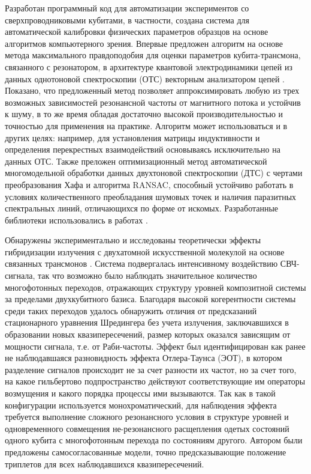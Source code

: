 \documentclass[14pt, a4paper]{extarticle}
\begin{document}
Разработан программный код для автоматизации экспериментов со сверхпроводниковыми кубитами, в частности, создана система для автоматической калибровки физических параметров образцов на основе алгоритмов компьютерного зрения. Впервые предложен алгоритм на основе метода максимального правдоподобия для оценки параметров кубита-трансмона, связанного с резонатором, в архитектуре квантовой электродинамики цепей из данных однотоновой спектроскопии (ОТС) векторным анализатором цепей . Показано, что предложенный метод позволяет аппроксимировать любую из трех возможных зависимостей резонансной частоты от магнитного потока и устойчив к шуму, в то же время обладая достаточно высокой производительностью и точностью для применения на практике. Алгоритм может использоваться и в других целях: например, для установления матрицы индуктивности и определения перекрестных взаимодействий основываясь исключительно на данных ОТС. Также преложен оптимизационный метод автоматической многомодельной обработки данных двухтоновой спектроскопии (ДТС) с чертами преобразования Хафа и алгоритма RANSAC, способный устойчиво работать в условиях количественного преобладания шумовых точек и наличия паразитных спектральных линий, отличающихся по форме от искомых. Разработанные библиотеки использовались в работах .

Обнаружены экспериментально и исследованы теоретически эффекты гибридизации излучения с двухатомной искусственной молекулой на основе связанных трансмонов \cite{fedorov2020light}. Система подвергалась интенсивному воздействию СВЧ-сигнала, так что возможно было наблюдать значительное количество многофотонных переходов, отражающих структуру уровней композитной системы за пределами двухкубитного базиса. Благодаря высокой когерентности системы среди таких переходов удалось обнаружить отличия от предсказаний стационарного уравнения Шредингера без учета излучения, заключавшихся в образовании новых квазипересечений, размер которых оказался зависящим от мощности сигнала, т.е. от Раби-частоты. Эффект был идентифицирован как ранее не наблюдавшаяся разновидность эффекта Отлера-Таунса (ЭОТ), в котором разделение сигналов происходит не за счет разности их частот, но за счет того, на какое гильбертово подпространство действуют соответствующие им операторы возмущения и какого порядка процессы ими вызываются. Так как в такой конфигурации используется монохроматический, для наблюдения эффекта требуется выполнение сложного резонансного условия в структуре уровней и одновременного совмещения не-резонансного расщепления одетых состояний одного кубита с многофотонным перехода по состояниям другого. Автором были предложены самосогласованные модели, точно предсказывающие положение триплетов для всех наблюдавшихся квазипересечений.
\end{document}

